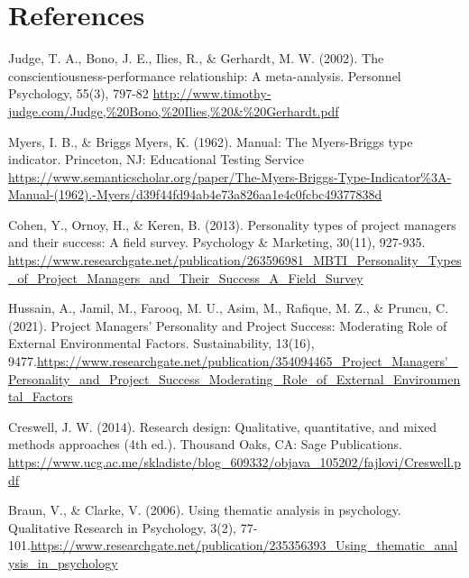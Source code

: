 \section{References}

    \begin{enumerate}[label={[\arabic*]}]
        \item Judge, T. A., Bono, J. E., Ilies, R., \& Gerhardt, M. W. (2002). The conscientiousness-performance relationship: A meta-analysis. Personnel Psychology, 55(3), 797-82 \url{http://www.timothy-judge.com/Judge,%20Bono,%20Ilies,%20&%20Gerhardt.pdf}

        \item Myers, I. B., \& Briggs Myers, K. (1962). Manual: The Myers-Briggs type indicator. Princeton, NJ: Educational Testing Service \url{https://www.semanticscholar.org/paper/The-Myers-Briggs-Type-Indicator%3A-Manual-(1962).-Myers/d39f44fd94ab4e73a826aa1e4c0fcbc49377838d}

        \item Cohen, Y., Ornoy, H., \& Keren, B. (2013). Personality types of project managers and their success: A field survey. Psychology \& Marketing, 30(11), 927-935. \url{https://www.researchgate.net/publication/263596981_MBTI_Personality_Types_of_Project_Managers_and_Their_Success_A_Field_Survey}

        \item Hussain, A., Jamil, M., Farooq, M. U., Asim, M., Rafique, M. Z., \& Pruncu, C. (2021). Project Managers’ Personality and Project Success: Moderating Role of External Environmental Factors. Sustainability, 13(16), 9477.\url{https://www.researchgate.net/publication/354094465_Project_Managers'_Personality_and_Project_Success_Moderating_Role_of_External_Environmental_Factors}

        \item Creswell, J. W. (2014). Research design: Qualitative, quantitative, and mixed methods approaches (4th ed.). Thousand Oaks, CA: Sage Publications. \url{https://www.ucg.ac.me/skladiste/blog_609332/objava_105202/fajlovi/Creswell.pdf}

        \item Braun, V., \& Clarke, V. (2006). Using thematic analysis in psychology. Qualitative Research in Psychology, 3(2), 77-101.\url{https://www.researchgate.net/publication/235356393_Using_thematic_analysis_in_psychology}
  
    \end{enumerate}